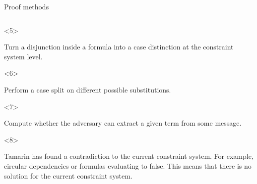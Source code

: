 \documentclass[11pt,aspectratio=169]{beamer}
\begin{document}
\begin{frame}[fragile]{Proof methods}
\begin{columns}[T]
\begin{column}{0.45\textwidth}
            \begin{onlyenv}<5>
                \begin{tcolorbox}[
                    title = {\small Disjunction\hfill(line 9)},
                    left = 1mm,
                    top = 1mm,
                    right = 1mm,
                    bottom = 1mm,
                ]
                    Turn a disjunction inside a formula into a case distinction 
                    at the constraint system level.
                \end{tcolorbox}
            \end{onlyenv}
            \begin{onlyenv}<6>
                \begin{tcolorbox}[
                    title = {\small Equation split\hfill(line 11)},
                    left = 1mm,
                    top = 1mm,
                    right = 1mm,
                    bottom = 1mm,
                ]
                    Perform a case split on different possible substitutions.
                \end{tcolorbox}
            \end{onlyenv}
            \begin{onlyenv}<7>
                \begin{tcolorbox}[
                    title = {\small Deconstruction chain (line 13)},
                    left = 1mm,
                    top = 1mm,
                    right = 1mm,
                    bottom = 1mm,
                ]
                    Compute whether the adversary can extract a given term from 
                    some message.
                \end{tcolorbox}
            \end{onlyenv}
            \begin{onlyenv}<8>
                \begin{tcolorbox}[
                    title = {\fontfamily{pcr}\fontseries{b}\selectfont contradiction},
                    left = 1mm,
                    top = 1mm,
                    right = 1mm,
                    bottom = 1mm,
                ]
                    Tamarin has found a contradiction to the current 
                    constraint system. For example, circular dependencies or 
                    formulas evaluating to false. This means that there is no 
                    solution for the current constraint system.
                \end{tcolorbox}
            \end{onlyenv}

\end{column}
\end{columns}
\end{frame}
\end{document}

